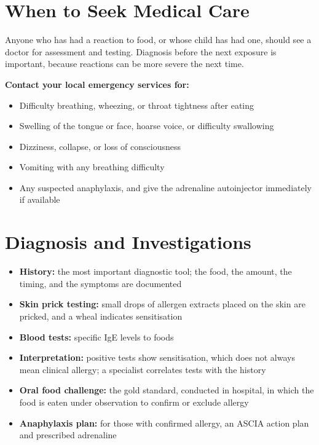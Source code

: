 \section*{When to Seek Medical Care}
Anyone who has had a reaction to food, or whose child has had one, should see a doctor for assessment and testing. Diagnosis before the next exposure is important, because reactions can be more severe the next time.

\textbf{Contact your local emergency services for:}
\begin{itemize}
    \item Difficulty breathing, wheezing, or throat tightness after eating
    \item Swelling of the tongue or face, hoarse voice, or difficulty swallowing
    \item Dizziness, collapse, or loss of consciousness
    \item Vomiting with any breathing difficulty
    \item Any suspected anaphylaxis, and give the adrenaline autoinjector immediately if available
\end{itemize}

\section*{Diagnosis and Investigations}
\begin{itemize}
    \item \textbf{History:} the most important diagnostic tool; the food, the amount, the timing, and the symptoms are documented
    \item \textbf{Skin prick testing:} small drops of allergen extracts placed on the skin are pricked, and a wheal indicates sensitisation
    \item \textbf{Blood tests:} specific IgE levels to foods
    \item \textbf{Interpretation:} positive tests show sensitisation, which does not always mean clinical allergy; a specialist correlates tests with the history
    \item \textbf{Oral food challenge:} the gold standard, conducted in hospital, in which the food is eaten under observation to confirm or exclude allergy
    \item \textbf{Anaphylaxis plan:} for those with confirmed allergy, an ASCIA action plan and prescribed adrenaline
\end{itemize}

